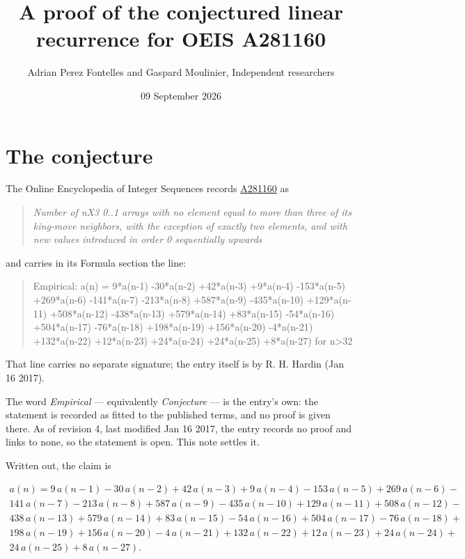 \documentclass[11pt]{article}
\title{A proof of the conjectured linear recurrence for OEIS A281160}
\author{Adrian Perez Fontelles and Gaspard Moulinier, Independent researchers}
\date{09 September 2026}
\theoremstyle{definition}
\begin{document}
\maketitle
\section{The conjecture}

The Online Encyclopedia of Integer Sequences records \href{https://oeis.org/A281160}{A281160} as

\begin{quote}\itshape Number of nX3 0..1 arrays with no element equal to more than three of its king-move neighbors, with the exception of exactly two elements, and with new values introduced in order 0 sequentially upwards\end{quote}

and carries in its Formula section the line:

\begin{quote}\ttfamily Empirical: a(n) = 9*a(n-1) -30*a(n-2) +42*a(n-3) +9*a(n-4) -153*a(n-5) +269*a(n-6) -141*a(n-7) -213*a(n-8) +587*a(n-9) -435*a(n-10) +129*a(n-11) +508*a(n-12) -438*a(n-13) +579*a(n-14) +83*a(n-15) -54*a(n-16) +504*a(n-17) -76*a(n-18) +198*a(n-19) +156*a(n-20) -4*a(n-21) +132*a(n-22) +12*a(n-23) +24*a(n-24) +24*a(n-25) +8*a(n-27) for n>32\end{quote}

That line carries no separate signature; the entry itself is by R. H. Hardin (Jan 16 2017).

The word {\itshape Empirical} --- equivalently {\itshape Conjecture} --- is the entry's own: the statement is recorded as fitted to the published terms, and no proof is given there. As of revision 4, last modified Jan 16 2017, the entry records no proof and links to none, so the statement is open. This note settles it.

Written out, the claim is

\begin{multline*} a(n) = 9\,a(n-1) - 30\,a(n-2) + 42\,a(n-3) + 9\,a(n-4) - 153\,a(n-5) + 269\,a(n-6) - \\ 141\,a(n-7) - 213\,a(n-8) + 587\,a(n-9) - 435\,a(n-10) + 129\,a(n-11) + 508\,a(n-12) - \\ 438\,a(n-13) + 579\,a(n-14) + 83\,a(n-15) - 54\,a(n-16) + 504\,a(n-17) - 76\,a(n-18) + \\ 198\,a(n-19) + 156\,a(n-20) - 4\,a(n-21) + 132\,a(n-22) + 12\,a(n-23) + 24\,a(n-24) + \\ 24\,a(n-25) + 8\,a(n-27). \end{multline*}
\end{document}
